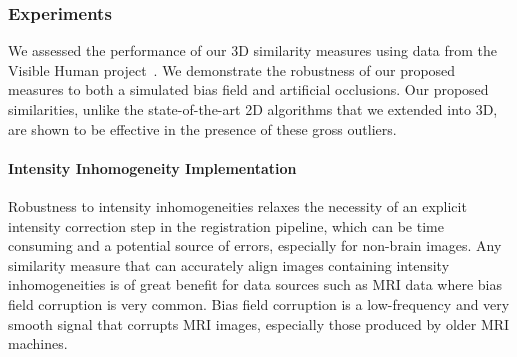 \subsubsection{Experiments}\label{subsubsec:singl_img_3d_lk_experiments}
We assessed the performance of our 3D similarity measures using data from the 
Visible Human project~\cite{spitzer1996visiblehuman}. 
We demonstrate the robustness of our
proposed measures to both a simulated bias field and artificial occlusions. Our
proposed similarities, unlike the state-of-the-art 2D algorithms that we
extended into 3D, are shown to be effective in the presence of these gross
outliers.
\paragraph{Intensity Inhomogeneity Implementation}\label{subsubsec:bias_fields}
Robustness to intensity inhomogeneities relaxes the necessity of an explicit
intensity correction step in the registration pipeline, which can be time
consuming and a potential source of errors, especially for non-brain images. Any
similarity measure that can accurately align images containing intensity
inhomogeneities is of great benefit for data sources such as MRI data where bias
field corruption is very common. Bias field corruption is a low-frequency and
very smooth signal that corrupts MRI images, especially those produced by older
MRI machines.

